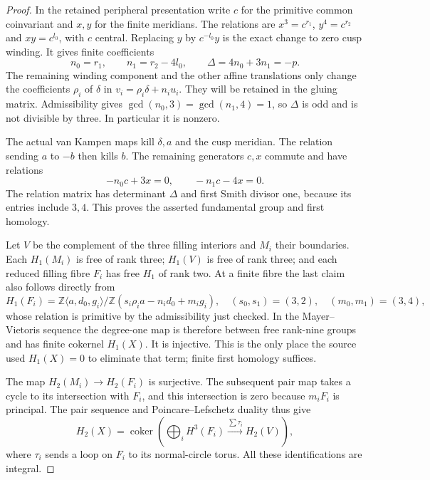 \begin{proof}
In the retained peripheral presentation write $c$ for the
primitive common coinvariant and $x,y$ for the finite meridians.
The relations are $x^3=c^{r_1}$, $y^4=c^{r_2}$ and
$xy=c^{l_0}$, with $c$ central. Replacing
$y$ by $c^{-l_0}y$ is the exact change to zero cusp winding.
It gives finite coefficients
\[
 n_0=r_1,\qquad n_1=r_2-4l_0,
 \qquad \Delta=4n_0+3n_1=-p.             \tag{E.19.1}
\]
The remaining winding component and the other affine translations
only change the coefficients $\rho_i$ of $\delta$ in
$v_i=\rho_i\delta+n_i u_i$. They will be retained in the
gluing matrix. Admissibility gives
$\gcd(n_0,3)=\gcd(n_1,4)=1$, so $\Delta$ is odd and is not
divisible by three. In particular it is nonzero.

The actual van Kampen maps kill $\delta,a$ and the cusp meridian.
The relation sending $a$ to $-b$ then kills $b$. The remaining
generators $c,x$ commute and have relations
\[
 -n_0c+3x=0,\qquad -n_1c-4x=0.
\]
The relation matrix has determinant $\Delta$ and first Smith
divisor one, because its entries include $3,4$. This proves the
asserted fundamental group and first homology.

Let $V$ be the complement of the three filling interiors and
$M_i$ their boundaries. Each $H_1(M_i)$ is free of rank three;
$H_1(V)$ is free of rank three; and each reduced filling fibre
$F_i$ has free $H_1$ of rank two. At a finite fibre the last
claim also follows directly from
\[
 H_1(F_i)=\mathbb Z\langle a,d_0,g_i\rangle/
  \mathbb Z(s_i\rho_i a-n_i d_0+m_i g_i),
 \quad(s_0,s_1)=(3,2),\quad(m_0,m_1)=(3,4),
\]
whose relation is primitive by the admissibility just checked.
In the Mayer--Vietoris sequence the degree-one map is therefore
between free rank-nine groups and has finite cokernel
$H_1(X)$. It is injective. This is the only place the source
used $H_1(X)=0$ to eliminate that term; finite first homology
suffices.

The map $H_2(M_i)\to H_2(F_i)$ is surjective. The subsequent
pair map takes a cycle to its intersection with $F_i$, and this
intersection is zero because $m_iF_i$ is principal. The pair
sequence and Poincare--Lefschetz duality thus give
\[
 H_2(X)=\operatorname{coker}\left(
  \bigoplus_i H^3(F_i)\xrightarrow{\sum\tau_i}H_2(V)
 \right),
\]
where $\tau_i$ sends a loop on $F_i$ to its normal-circle torus.
All these identifications are integral.


\end{proof}

